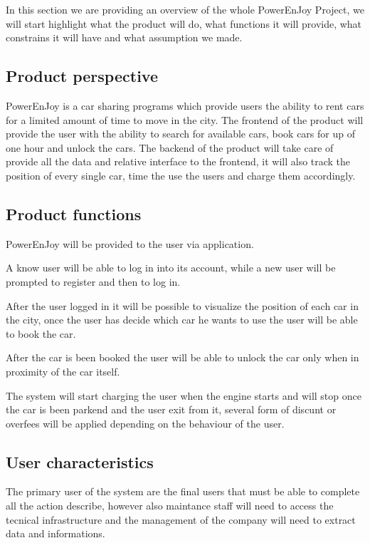 \documentclass[11pt]{article} %
\newcommand{\pe}{PowerEnJoy }
\begin{document}
In this section we are providing an overview of the whole \pe Project, we will start highlight what the product will do, what functions it will provide, what constrains it will have and what assumption we made.

  \subsection{Product perspective}
  
  \pe is a car sharing programs which provide users the ability to rent cars for a limited amount of time to move in the city. 
  The frontend of the product will provide the user with the ability to search for available cars, book cars for up of one hour and unlock the cars.
  The backend of the product will take care of provide all the data and relative interface to the frontend, it will also track the position of every single car, time the use the users and charge them accordingly.
  
  \subsection{Product functions}
  
  \pe will be provided to the user via application.
  
  A know user will be able to log in into its account, while a new user will be prompted to register and then to log in.
  
  After the user logged in it will be possible to visualize the position of each car in the city, once the user has decide which car he wants to use the user will be able to book the car.
  
  After the car is been booked the user will be able to unlock the car only when in proximity of the car itself.
  
  The system will start charging the user when the engine starts and will stop once the car is been parkend and the user exit from it, several form of discunt or overfees will be applied depending on the behaviour of the user.
  
  \subsection{User characteristics}
  
  The primary user of the system are the final users that must be able to complete all the action describe, however also maintance staff will need to access the tecnical infrastructure and the management of the company will need to extract data and informations.
  
\end{document}
